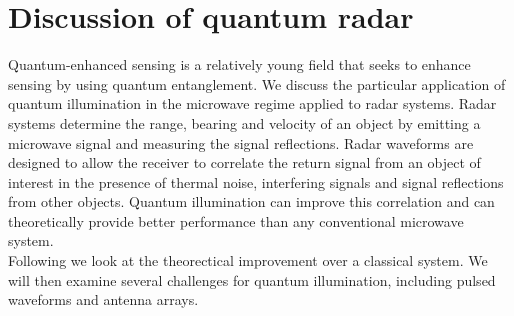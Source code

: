\documentclass[a4paper,10pt,twocolumn]{article}
\numberwithin{equation}{section}
\begin{document}
\section{Discussion of quantum radar}
Quantum-enhanced sensing is a relatively young field that seeks to enhance sensing by using quantum entanglement. 
We discuss the particular application of quantum illumination in the microwave regime applied to radar systems.
Radar systems determine the range, bearing and velocity of an object by emitting a microwave signal and measuring the signal reflections.
Radar waveforms are designed to allow the receiver to correlate the return signal from an object of interest in the presence of thermal noise, interfering signals and signal reflections from other objects.
Quantum illumination can improve this correlation and can theoretically provide better performance than any conventional microwave system. 
\\
Following \cite{qi} we look at the theorectical improvement over a classical system. 
We will then examine several challenges for quantum illumination, including pulsed waveforms and antenna arrays.
\printbibliography
\end{document}
